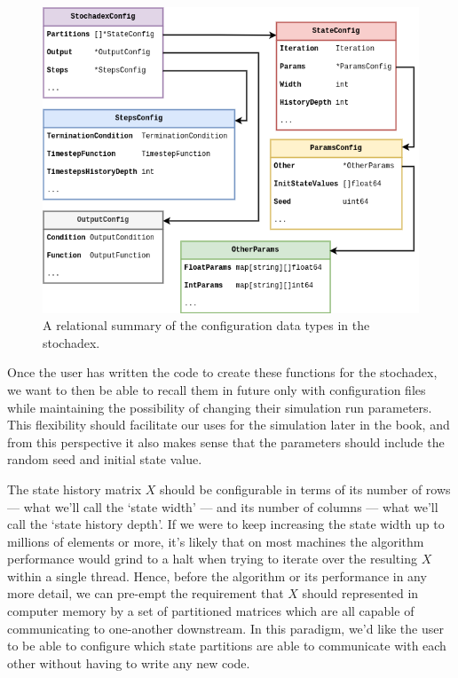 \begin{figure}[h]
\centering
\includegraphics[width=13cm]{images/chapter-1-stochadex-data-types.drawio.png}
\caption{A relational summary of the configuration data types in the stochadex.}
\label{fig:data-types-design}
\end{figure}

Once the user has written the code to create these functions for the stochadex, we want to then be able to recall them in future only with configuration files while maintaining the possibility of changing their simulation run parameters. This flexibility should facilitate our uses for the simulation later in the book, and from this perspective it also makes sense that the parameters should include the random seed and initial state value.

The state history matrix $X$ should be configurable in terms of its number of rows --- what we'll call the `state width' --- and its number of columns --- what we'll call the `state history depth'. If we were to keep increasing the state width up to millions of elements or more, it's likely that on most machines the algorithm performance would grind to a halt when trying to iterate over the resulting $X$ within a single thread. Hence, before the algorithm or its performance in any more detail, we can pre-empt the requirement that $X$ should represented in computer memory by a set of partitioned matrices which are all capable of communicating to one-another downstream. In this paradigm, we'd like the user to be able to configure which state partitions are able to communicate with each other without having to write any new code.

